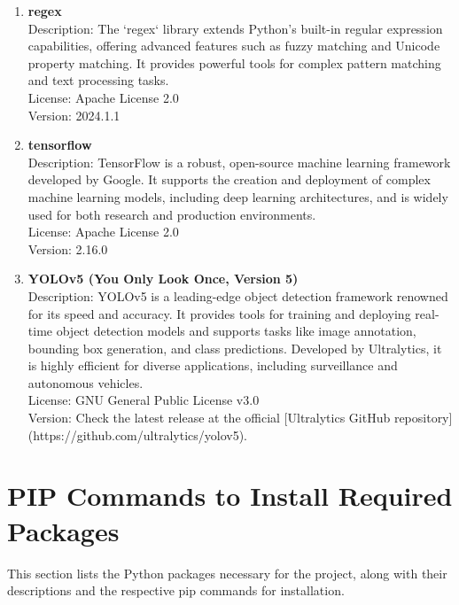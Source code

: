 \begin{enumerate}
	\item \textbf{regex} \\
	Description: The `regex` library extends Python’s built-in regular expression capabilities, offering advanced features such as fuzzy matching and Unicode property matching. It provides powerful tools for complex pattern matching and text processing tasks. \\
	License: Apache License 2.0 \\
	Version: 2024.1.1
	
	\item \textbf{tensorflow} \\
	Description: TensorFlow is a robust, open-source machine learning framework developed by Google. It supports the creation and deployment of complex machine learning models, including deep learning architectures, and is widely used for both research and production environments. \\
	License: Apache License 2.0 \\
	Version: 2.16.0
	
	\item \textbf{YOLOv5 (You Only Look Once, Version 5)} \\
	Description: YOLOv5 is a leading-edge object detection framework renowned for its speed and accuracy. It provides tools for training and deploying real-time object detection models and supports tasks like image annotation, bounding box generation, and class predictions. Developed by Ultralytics, it is highly efficient for diverse applications, including surveillance and autonomous vehicles. \\
	License: GNU General Public License v3.0 \\
	Version: Check the latest release at the official [Ultralytics GitHub repository](https://github.com/ultralytics/yolov5).
\end{enumerate}






\section{PIP Commands to Install Required Packages}
This section lists the Python packages necessary for the project, along with their descriptions and the respective pip commands for installation.

